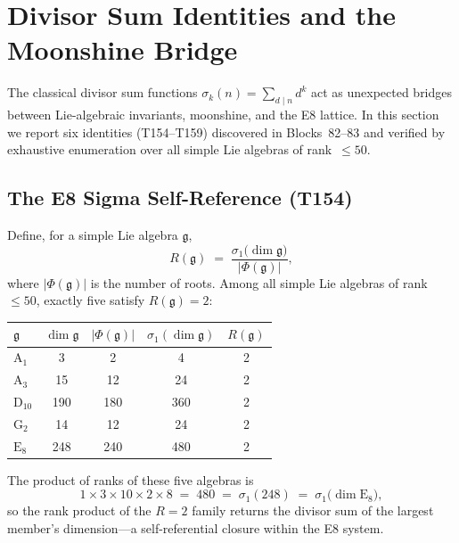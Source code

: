 \documentclass[aps,prd,twocolumn,superscriptaddress,floatfix,nofootinbib]{revtex4-2}
\theoremstyle{definition}
\theoremstyle{remark}
\begin{document}
\section{Divisor Sum Identities and the Moonshine Bridge}
\label{sec:sigma-moonshine}

The classical divisor sum functions $\sigma_k(n) = \sum_{d \mid n} d^k$ act as
unexpected bridges between Lie-algebraic invariants, moonshine, and the E8
lattice.  In this section we report six identities (T154--T159) discovered
in Blocks~82--83 and verified by exhaustive enumeration over all simple Lie
algebras of rank~$\le 50$.

\subsection{The E8 Sigma Self-Reference (T154)}
\label{sec:sigma-self-ref}

Define, for a simple Lie algebra $\mathfrak{g}$,
\begin{equation}
  R(\mathfrak{g}) \;=\; \frac{\sigma_1\!\bigl(\dim\mathfrak{g}\bigr)}{|\Phi(\mathfrak{g})|},
  \label{eq:R-def}
\end{equation}
where $|\Phi(\mathfrak{g})|$ is the number of roots.  Among all simple
Lie algebras of rank~$\le 50$, exactly five satisfy $R(\mathfrak{g})=2$:

\begin{center}
\begin{tabular}{lcccc}
\toprule
$\mathfrak{g}$ & $\dim\mathfrak{g}$ & $|\Phi(\mathfrak{g})|$ &
  $\sigma_1(\dim\mathfrak{g})$ & $R(\mathfrak{g})$ \\
\midrule
$\mathrm{A}_1$  & 3   & 2   & 4   & 2 \\
$\mathrm{A}_3$  & 15  & 12  & 24  & 2 \\
$\mathrm{D}_{10}$ & 190 & 180 & 360 & 2 \\
$\mathrm{G}_2$  & 14  & 12  & 24  & 2 \\
$\mathrm{E}_8$  & 248 & 240 & 480 & 2 \\
\bottomrule
\end{tabular}
\end{center}

\noindent
The product of ranks of these five algebras is
\begin{equation}
  1 \times 3 \times 10 \times 2 \times 8 \;=\; 480
  \;=\; \sigma_1(248) \;=\; \sigma_1\!\bigl(\dim\mathrm{E}_8\bigr),
  \label{eq:rank-product-480}
\end{equation}
so the rank product of the $R{=}2$ family returns the divisor sum of
the largest member's dimension---a self-referential closure within the
E8 system.
\end{document}
